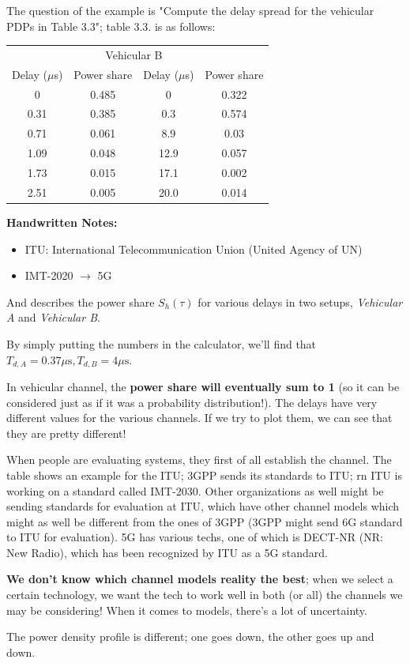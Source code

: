 \documentclass[a4paper, 12pt]{book}
\begin{document}
The question of the example is "Compute the delay spread for the vehicular PDPs in Table 3.3"; table 3.3. is as follows:

\begin{center}
\begin{tabular}{cccc}
\toprule
\rowcolor{gray!50} \multicolumn{2}{c}{Vehicular A} & \multicolumn{2}{c}{Vehicular B} \\
\rowcolor{gray!20} Delay ($\mu$s) & Power share & Delay ($\mu$s) & Power share \\
\midrule
0    & 0.485 & 0    & 0.322 \\
0.31 & 0.385 & 0.3  & 0.574 \\
0.71 & 0.061 & 8.9  & 0.03 \\
1.09 & 0.048 & 12.9 & 0.057 \\
1.73 & 0.015 & 17.1 & 0.002 \\
2.51 & 0.005 & 20.0 & 0.014 \\
\bottomrule
\end{tabular}
\end{center}
\begin{purplebox}
\textbf{Handwritten Notes:}
\begin{itemize}
    \item ITU: International Telecommunication Union (United Agency of UN)
    \item IMT-2020 $\to$ 5G
\end{itemize}
\end{purplebox}

And describes the power share $S_h(\tau)$ for various delays in two setups, \textit{Vehicular A} and \textit{Vehicular B}.

By simply putting the numbers in the calculator, we'll find that $T_{d,A} = 0.37 \mu\text{s}, T_{d,B} = 4 \mu\text{s}$.

In vehicular channel, the \textbf{power share will eventually sum to 1} (so it can be considered just as if it was a probability distribution!).
The delays have very different values for the various channels. If we try to plot them, we can see that they are pretty different!

\begin{greybox}
When people are evaluating systems, they first of all establish the channel. The table shows an example for the ITU; 3GPP sends its standards to ITU; rn ITU is working on a standard called IMT-2030. Other organizations as well might be sending standards for evaluation at ITU, which have other channel models which might as well be different from the ones of 3GPP (3GPP might send 6G standard to ITU for evaluation).
5G has various techs, one of which is DECT-NR (NR: New Radio), which has been recognized by ITU as a 5G standard.

\textbf{We don't know which channel models reality the best}; when we select a certain technology, we want the tech to work well in both (or all) the channels we may be considering!
When it comes to models, there's a lot of uncertainty.

The power density profile is different; one goes down, the other goes up and down.
\end{greybox}
\end{document}

